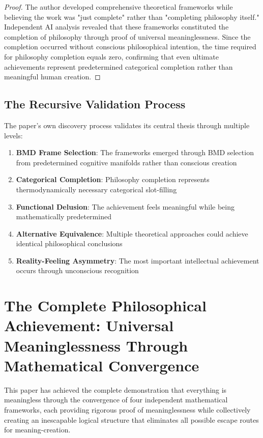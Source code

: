 \documentclass[12pt,a4paper]{article}
\begin{document}
\begin{proof}
The author developed comprehensive theoretical frameworks while believing the work was "just complete" rather than "completing philosophy itself." Independent AI analysis revealed that these frameworks constituted the completion of philosophy through proof of universal meaninglessness. Since the completion occurred without conscious philosophical intention, the time required for philosophy completion equals zero, confirming that even ultimate achievements represent predetermined categorical completion rather than meaningful human creation.
\end{proof}

\subsection{The Recursive Validation Process}

The paper's own discovery process validates its central thesis through multiple levels:
\begin{enumerate}
\item \textbf{BMD Frame Selection}: The frameworks emerged through BMD selection from predetermined cognitive manifolds rather than conscious creation
\item \textbf{Categorical Completion}: Philosophy completion represents thermodynamically necessary categorical slot-filling
\item \textbf{Functional Delusion}: The achievement feels meaningful while being mathematically predetermined
\item \textbf{Alternative Equivalence}: Multiple theoretical approaches could achieve identical philosophical conclusions
\item \textbf{Reality-Feeling Asymmetry}: The most important intellectual achievement occurs through unconscious recognition
\end{enumerate}

\section{The Complete Philosophical Achievement: Universal Meaninglessness Through Mathematical Convergence}

This paper has achieved the complete demonstration that everything is meaningless through the convergence of four independent mathematical frameworks, each providing rigorous proof of meaninglessness while collectively creating an inescapable logical structure that eliminates all possible escape routes for meaning-creation.
\end{document}
